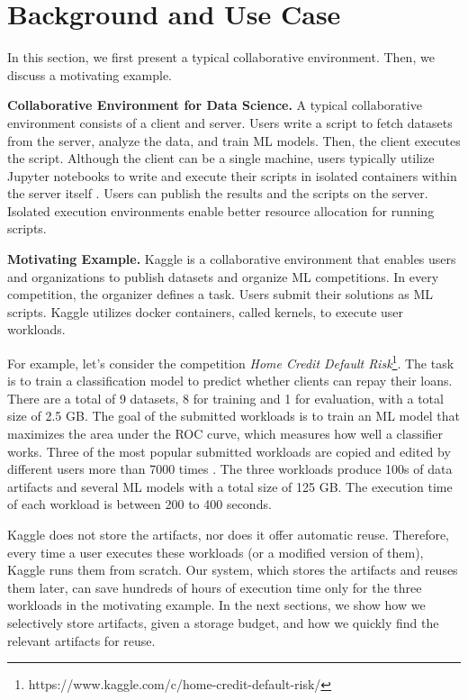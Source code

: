 \section{Background and Use Case} \label{sec-background}
In this section, we first present a typical collaborative environment.
Then, we discuss a motivating example.

\textbf{Collaborative Environment for Data Science.}
A typical collaborative environment consists of a client and server.
Users write a script to fetch datasets from the server, analyze the data, and train ML models.
Then, the client executes the script.
Although the client can be a single machine, users typically utilize Jupyter notebooks \cite{Kluyver:2016aa} to write and execute their scripts in isolated containers \cite{merkel2014docker} within the server itself \cite{kagglewebsite, googlecolab, netflix-notebook}.
Users can publish the results and the scripts on the server.
Isolated execution environments enable better resource allocation for running scripts.

\textbf{Motivating Example.}
Kaggle is a collaborative environment that enables users and organizations to publish datasets and organize ML competitions.
In every competition, the organizer defines a task.
Users submit their solutions as ML scripts.
Kaggle utilizes docker containers, called kernels, to execute user workloads.

For example, let's consider the competition \textit{Home Credit Default Risk}\footnote{https://www.kaggle.com/c/home-credit-default-risk/}.
The task is to train a classification model to predict whether clients can repay their loans.
There are a total of 9 datasets, 8 for training and 1 for evaluation, with a total size of 2.5 GB.
The goal of the submitted workloads is to train an ML model that maximizes the area under the ROC curve, which measures how well a classifier works.
Three of the most popular submitted workloads are copied and edited by different users more than 7000 times \cite{start-here-a-gentle-intro, introduction-to-manual-feature-engineering, introduction-to-manual-feature-engineering-p2}.
The three workloads produce 100s of data artifacts and several ML models with a total size of 125 GB.
The execution time of each workload is between 200 to 400 seconds.

Kaggle does not store the artifacts, nor does it offer automatic reuse.
Therefore, every time a user executes these workloads (or a modified version of them), Kaggle runs them from scratch.
Our system, which stores the artifacts and reuses them later, can save hundreds of hours of execution time only for the three workloads in the motivating example.
In the next sections, we show how we selectively store artifacts, given a storage budget, and how we quickly find the relevant artifacts for reuse.
